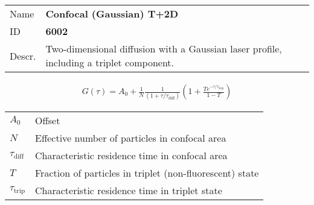 \noindent \begin{tabular}{lp{}}
Name & \textbf{Confocal (Gaussian) T+2D} \\ 
ID & \textbf{6002} \\ 
Descr. &  Two-dimensional diffusion with a Gaussian laser profile, including a triplet component\cite{Aragon1976, Qian1991, Rigler1993,Widengren1994, Widengren1995, Haupts1998}. \\ 
\end{tabular}
\begin{align}
G(\tau) = A_0 + \frac{1}{N} \frac{1}{(1+\tau/\tau_\mathrm{diff})}  \left(1 + \frac{T e^{-\tau/\tau_\mathrm{trip}}}{1-T}  \right)
\end{align} 
\begin{center}
\begin{tabular}{ll}
$A_0$ & Offset \\ 
$N$ & Effective number of particles in confocal area \\ 
$\tau_\mathrm{diff}$ &  Characteristic residence time in confocal area \\ 
$T$ &  Fraction of particles in triplet (non-fluorescent) state\\ 
$\tau_\mathrm{trip}$ &  Characteristic residence time in triplet state \\ 
\end{tabular}
\end{center}
\vspace{2em}



